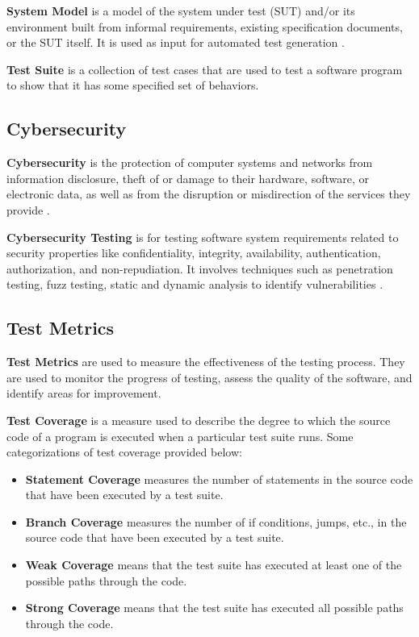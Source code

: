 \textbf{System Model} is a model of the system under test (SUT) and/or its environment built from informal requirements, existing specification documents, or the SUT itself. It is used as input for automated test generation \cite{FELDERER20161}.

\textbf{Test Suite} is a collection of test cases that are used to test a software program to show that it has some specified set of behaviors.

\subsection{Cybersecurity}

\textbf{Cybersecurity} is the protection of computer systems and networks from information disclosure, theft of or damage to their hardware, software, or electronic data, as well as from the disruption or misdirection of the services they provide \cite{FELDERER20161}.

\textbf{Cybersecurity Testing} is for testing software system requirements related to security properties like confidentiality, integrity, availability, authentication, authorization, and non-repudiation. It involves techniques such as penetration testing, fuzz testing, static and dynamic analysis to identify vulnerabilities \cite{FELDERER20161}.

\subsection{Test Metrics}

\textbf{Test Metrics} are used to measure the effectiveness of the testing process. They are used to monitor the progress of testing, assess the quality of the software, and identify areas for improvement.

\textbf{Test Coverage} is a measure used to describe the degree to which the source code of a program is executed when a particular test suite runs. Some categorizations of test coverage provided below:

\begin{itemize}
    \item \textbf{Statement Coverage} measures the number of statements in the source code that have been executed by a test suite.
    \item \textbf{Branch Coverage} measures the number of if conditions, jumps, etc., in the source code that have been executed by a test suite.
    \item \textbf{Weak Coverage} means that the test suite has executed at least one of the possible paths through the code.
    \item \textbf{Strong Coverage} means that the test suite has executed all possible paths through the code.
\end{itemize}


